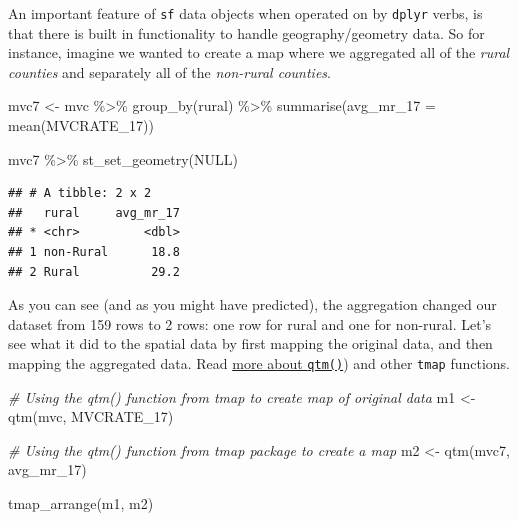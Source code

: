\documentclass[
]{book}
\newenvironment{Shaded}{\begin{snugshade}}{\end{snugshade}}
\newcommand{\AttributeTok}[1]{\textcolor[rgb]{0.77,0.63,0.00}{#1}}
\newcommand{\CommentTok}[1]{\textcolor[rgb]{0.56,0.35,0.01}{\textit{#1}}}
\newcommand{\ConstantTok}[1]{\textcolor[rgb]{0.00,0.00,0.00}{#1}}
\newcommand{\FunctionTok}[1]{\textcolor[rgb]{0.00,0.00,0.00}{#1}}
\newcommand{\NormalTok}[1]{#1}
\newcommand{\OtherTok}[1]{\textcolor[rgb]{0.56,0.35,0.01}{#1}}
\newcommand{\SpecialCharTok}[1]{\textcolor[rgb]{0.00,0.00,0.00}{#1}}
\newcommand{\StringTok}[1]{\textcolor[rgb]{0.31,0.60,0.02}{#1}}
\begin{document}
An important feature of \texttt{sf} data objects when operated on by \texttt{dplyr} verbs, is that there is built in functionality to handle geography/geometry data. So for instance, imagine we wanted to create a map where we aggregated all of the \emph{rural counties} and separately all of the \emph{non-rural counties}.

\begin{Shaded}
\begin{Highlighting}[]
\NormalTok{mvc7 }\OtherTok{\textless{}{-}}\NormalTok{ mvc }\SpecialCharTok{\%\textgreater{}\%}
  \FunctionTok{group\_by}\NormalTok{(rural) }\SpecialCharTok{\%\textgreater{}\%}
  \FunctionTok{summarise}\NormalTok{(}\AttributeTok{avg\_mr\_17 =} \FunctionTok{mean}\NormalTok{(MVCRATE\_17))}

\NormalTok{mvc7 }\SpecialCharTok{\%\textgreater{}\%} \FunctionTok{st\_set\_geometry}\NormalTok{(}\ConstantTok{NULL}\NormalTok{)}
\end{Highlighting}
\end{Shaded}

\begin{verbatim}
## # A tibble: 2 x 2
##   rural     avg_mr_17
## * <chr>         <dbl>
## 1 non-Rural      18.8
## 2 Rural          29.2
\end{verbatim}

As you can see (and as you might have predicted), the aggregation changed our dataset from 159 rows to 2 rows: one row for rural and one for non-rural. Let's see what it did to the spatial data by first mapping the original data, and then mapping the aggregated data. Read \protect\hyperlink{qtm}{more about \texttt{qtm()}}) and other \texttt{tmap} functions.

\begin{Shaded}
\begin{Highlighting}[]
\CommentTok{\# Using the qtm() function from tmap to create map of original data}
\NormalTok{m1 }\OtherTok{\textless{}{-}} \FunctionTok{qtm}\NormalTok{(mvc, }\StringTok{\textquotesingle{}MVCRATE\_17\textquotesingle{}}\NormalTok{)}

\CommentTok{\# Using the qtm() function from tmap package to create a map}
\NormalTok{m2 }\OtherTok{\textless{}{-}} \FunctionTok{qtm}\NormalTok{(mvc7, }\StringTok{\textquotesingle{}avg\_mr\_17\textquotesingle{}}\NormalTok{)}

\FunctionTok{tmap\_arrange}\NormalTok{(m1, m2)}
\end{Highlighting}
\end{Shaded}
\end{document}

